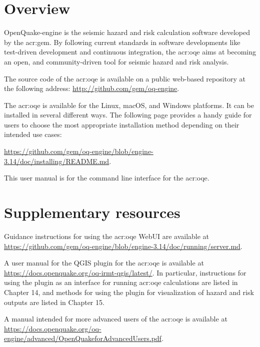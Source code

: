 \section{Overview}

OpenQuake-engine is the seismic hazard and risk calculation software developed by
the \glsdesc{acr:gem}. By following current standards in software
developments like test-driven development and continuous integration, the
\glsdesc{acr:oqe} aims at becoming an open, and community-driven tool for
seismic hazard and risk analysis.

The source code of the \glsdesc{acr:oqe} is available on a public web-based
repository at the following address:
\href{http://github.com/gem/oq-engine}{http://github.com/gem/oq-engine}.

The \glsdesc{acr:oqe} is available for the Linux, macOS, and Windows
platforms. It can be installed in several different ways. The following page
provides a handy guide for users to choose the most appropriate installation
method depending on their intended use cases:

\href{https://github.com/gem/oq-engine/blob/engine-3.14/doc/installing/README.md}{https://github.com/gem/oq-engine/blob/engine-3.14/doc/installing/README.md}.

This user manual is for the command line interface for the \glsdesc{acr:oqe}.


\section{Supplementary resources}

Guidance instructions for using the \glsdesc{acr:oqe} WebUI are available 
at \href{https://github.com/gem/oq-engine/blob/engine-3.14/doc/running/server.md}{https://github.com/gem/oq-engine/blob/engine-3.14/doc/running/server.md}.

A user manual for the QGIS plugin for the \glsdesc{acr:oqe} is available at 
\href{https://docs.openquake.org/oq-irmt-qgis/latest/}{https://docs.openquake.org/oq-irmt-qgis/latest/}. 
In particular, instructions for using the plugin as an interface for running \glsdesc{acr:oqe}
calculations are listed in Chapter 14, and methods for using the plugin for visualization 
of hazard and risk outputs are listed in Chapter 15.

A manual intended for more advanced users of the \glsdesc{acr:oqe} is available
at \href{https://docs.openquake.org/oq-engine/advanced/OpenQuakeforAdvancedUsers.pdf}{https://docs.openquake.org/oq-engine/advanced/OpenQuakeforAdvancedUsers.pdf}.

